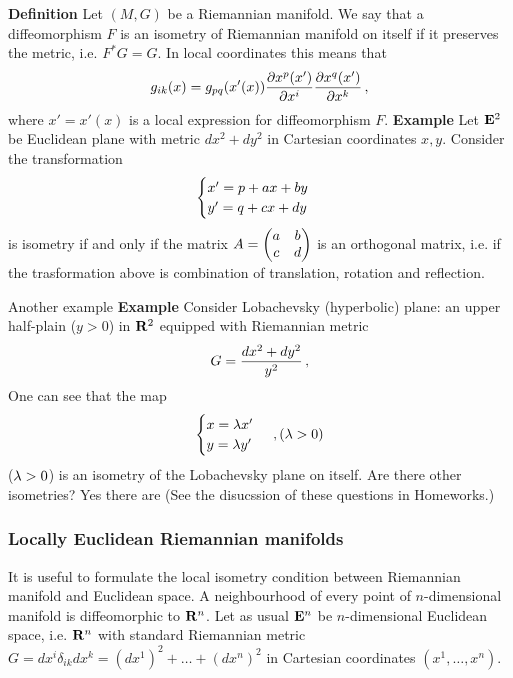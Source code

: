 \documentclass[12pt]{article}
\theoremstyle{theorem}
\numberwithin{equation}{section}
\begin{document}
{\bf Definition} Let $(M,G)$ be a Riemannian manifold. We say that
a diffeomorphism $F$ is an isometry of Riemannian manifold
on itself if it preserves the metric, i.e. $F^*G=G$.
In local coordinates this means that
              \begin{equation}\label{isometry1}
        g_{ik}(x)=g_{pq}(x'(x)){\partial x^p(x')\over \partial x^i}
                       {\partial x^q(x')\over \partial x^k}\,,
               \end{equation}
where $x'=x'(x)$ is a local expression for diffeomorphism $F$.
{\bf Example}  Let ${\bf E}^2$ be Euclidean plane with metric $dx^2+dy^2$
in Cartesian coordinates $x,y$. Consider the transformation
       \begin{equation*}
   \begin{cases}
      x'=p+ax+by\cr
     y'=q+cx+dy\cr
    \end{cases}
          \end{equation*}
is isometry if and only if the matrix 
$A=\begin{pmatrix}a &b\cr c &d\cr\end{pmatrix}$
is an orthogonal matrix, i.e. if the trasformation above
is combination of translation, rotation and reflection.

\medskip

Another example
  {\bf Example} Consider Lobachevsky (hyperbolic) plane:
     an upper half-plain ($y>0$) 
in ${\bf R}^2$ equipped with 
Riemannian metric
            $$
     G={dx^2+dy^2\over y^2}\,,
            $$
One can see that  the map 
$$
\begin{cases} 
x=\lambda x'\cr y=\lambda y'\cr
 \end{cases}\,, (\lambda>0)
     $$
($\lambda>0$)  is an isometry of the Lobachevsky plane on itself.
Are there other isometries? Yes  there are 
(See the disucssion of these questions in Homeworks.) 



\subsubsection {Locally Euclidean Riemannian 
 manifolds }


It is useful to formulate the  local isometry condition between
Riemannian manifold and Euclidean space.
A neighbourhood of every point of $n$-dimensional
 manifold is diffeomorphic to ${\bf R}^n$.
Let as usual ${\bf E}^n$ be $n$-dimensional
Euclidean space, i.e. ${\bf R}^n$  with standard Riemannian metric
$G=dx^i\delta_{ik}dx^k=(dx^1)^2+\dots+(dx^n)^2$
in Cartesian coordinates $(x^1,\dots,x^n)$.
\end{document}
